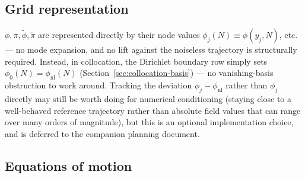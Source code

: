 \documentclass[a4paper,11pt]{article}
\newcommand{\Ny}{N}                          %
\newcommand{\field}{\phi}                    %
\newcommand{\mom}{\pi}                       %
\newcommand{\phinl}{\field_{\mathrm{nl}}}    %
\newcommand{\rfield}{\widetilde\field}       %
\newcommand{\rmom}{\widetilde\mom}           %
\newcommand{\yco}{y}                         %
\begin{document}
\subsection{Grid representation}

$\field,\mom,\rfield,\rmom$ are represented directly by their node values
$\field_j(\Ny)\equiv\field(\yco_j,\Ny)$, etc. --- no mode expansion, and no
lift against the noiseless trajectory is structurally required.
Instead, in
collocation, the Dirichlet boundary row simply sets $\field_0(\Ny)=\phinl(\Ny)$
(Section~\ref{sec:collocation-basis}) --- no vanishing-basis obstruction
to work around. Tracking the deviation $\field_j-\phinl$ rather than
$\field_j$ directly may still be worth doing for numerical conditioning
(staying close to a well-behaved reference trajectory rather than
absolute field values that can range over many orders of magnitude), but
this is an optional implementation choice, and is deferred to the companion planning document.

\subsection{Equations of motion}
\end{document}
